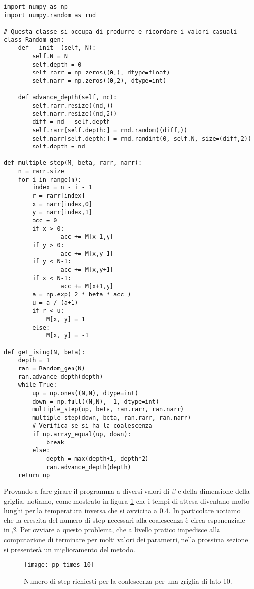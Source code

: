 \documentclass[]{marticle}
\begin{document}
\begin{lstlisting}
import numpy as np
import numpy.random as rnd

# Questa classe si occupa di produrre e ricordare i valori casuali
class Random_gen:
    def __init__(self, N):
        self.N = N
        self.depth = 0
        self.rarr = np.zeros((0,), dtype=float)
        self.narr = np.zeros((0,2), dtype=int)

    def advance_depth(self, nd):
        self.rarr.resize((nd,))
        self.narr.resize((nd,2))
        diff = nd - self.depth
        self.rarr[self.depth:] = rnd.random((diff,))
        self.narr[self.depth:] = rnd.randint(0, self.N, size=(diff,2))
        self.depth = nd

def multiple_step(M, beta, rarr, narr):
    n = rarr.size
    for i in range(n):
        index = n - i - 1
        r = rarr[index]
        x = narr[index,0]
        y = narr[index,1]
        acc = 0
        if x > 0:
                acc += M[x-1,y]
        if y > 0:
                acc += M[x,y-1]
        if y < N-1:
                acc += M[x,y+1]
        if x < N-1:
                acc += M[x+1,y]
        a = np.exp( 2 * beta * acc )
        u = a / (a+1)
        if r < u:
            M[x, y] = 1
        else:
            M[x, y] = -1

def get_ising(N, beta):
    depth = 1
    ran = Random_gen(N)
    ran.advance_depth(depth)
    while True:
        up = np.ones((N,N), dtype=int)
        down = np.full((N,N), -1, dtype=int)
        multiple_step(up, beta, ran.rarr, ran.narr)
        multiple_step(down, beta, ran.rarr, ran.narr)
        # Verifica se si ha la coalescenza
        if np.array_equal(up, down): 
            break
        else:
            depth = max(depth+1, depth*2)
            ran.advance_depth(depth)
    return up
\end{lstlisting}

Provando a fare girare il programma a diversi valori di $\beta$ e della
dimensione della griglia, notiamo, come mostrato in figura \ref{fig:plot1} che i
tempi di attesa diventano molto lunghi per la temperatura inversa che si
avvicina a $0.4$. In particolare notiamo che la crescita del numero di step
necessari alla coalescenza \`e circa esponenziale in $\beta$. Per ovviare a
questo problema, che a livello pratico impedisce alla computazione di terminare
per molti valori dei parametri, nella prossima sezione si presenter\`a un
miglioramento del metodo.

\begin{figure}[h!]
\caption{Numero di step richiesti per la coalescenza per una griglia di lato 10.}
\texttt{[image: pp\_times\_10]}
\label{fig:plot1}
\centering
\end{figure}
\end{document}
